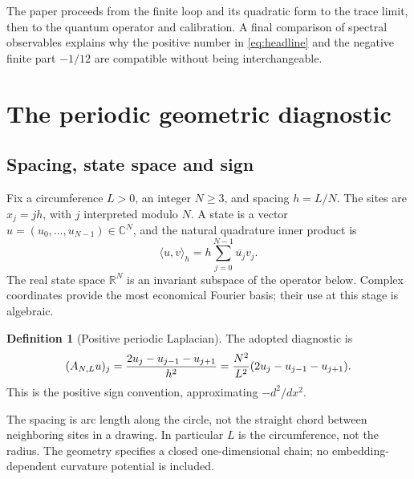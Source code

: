 \documentclass[11pt,a4paper]{article}
\theoremstyle{definition}\newtheorem{definition}[theorem]{Definition}
\theoremstyle{remark}\newtheorem{remark}[theorem]{Remark}
\newcommand{\C}{\mathbb C}\newcommand{\R}{\mathbb R}\newcommand{\Z}{\mathbb Z}
\newcommand{\ip}[2]{\langle #1,#2\rangle_h}
\numberwithin{equation}{section}
\begin{document}
The paper proceeds from the finite loop and its quadratic form to the trace
limit, then to the quantum operator and calibration. A final comparison of
spectral observables explains why the positive number in
\eqref{eq:headline} and the negative finite part \(-1/12\) are compatible
without being interchangeable.

\section{The periodic geometric diagnostic}\label{sec:discrete}
\subsection{Spacing, state space and sign}
Fix a circumference \(L>0\), an integer \(N\geq3\), and spacing \(h=L/N\).
The sites are \(x_j=jh\), with \(j\) interpreted modulo \(N\).
A state is a vector \(u=(u_0,\ldots,u_{N-1})\in\C^N\), and the natural
quadrature inner product is
\begin{equation}
 \ip{u}{v}=h\sum_{j=0}^{N-1}\overline{u_j}v_j.
 \label{eq:inner}
\end{equation}
The real state space \(\R^N\) is an invariant subspace of the operator below.
Complex coordinates provide the most economical Fourier basis; their use
at this stage is algebraic.

\begin{definition}[Positive periodic Laplacian]\label{def:lap}
The adopted diagnostic is
\begin{equation}
 (A_{N,L} u)_j=\frac{2u_j-u_{j-1}-u_{j+1}}{h^2}
          =\frac{N^2}{L^2}(2u_j-u_{j-1}-u_{j+1}).
 \label{eq:lap}
\end{equation}
This is the positive sign convention, approximating \(-d^2/dx^2\).
\end{definition}
The spacing is arc length along the circle, not the straight chord between
neighboring sites in a drawing. In particular \(L\) is the circumference,
not the radius. The geometry specifies a closed one-dimensional chain;
no embedding-dependent curvature potential is included.
\end{document}
